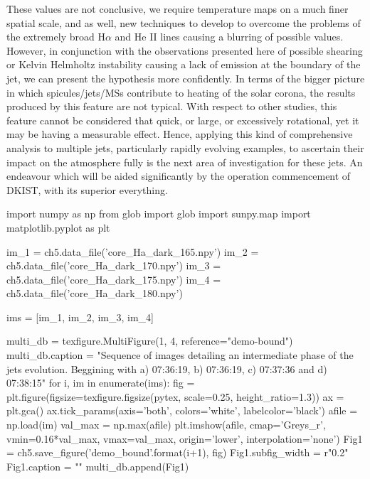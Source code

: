 These values are not conclusive, we require temperature maps on a much finer spatial scale, and as well, new techniques to develop to overcome the problems of the extremely broad H$\alpha$ and He II lines causing a blurring of possible values.
However, in conjunction with the observations presented here of possible shearing or Kelvin Helmholtz instability causing a lack of emission at the boundary of the jet, we can present the hypothesis more confidently.
In terms of the bigger picture in which spicules/jets/MSs contribute to heating of the solar corona, the results produced by this feature are not typical.
With respect to other studies, this feature cannot be considered that quick, or large, or excessively rotational, yet it may be having a measurable effect.
Hence, applying this kind of comprehensive analysis to multiple jets, particularly rapidly evolving examples, to ascertain their impact on the atmosphere fully is the next area of investigation for these jets.
An endeavour which will be aided significantly by the operation commencement of DKIST, with its superior everything.
 


\begin{pycode}[chapter5]
import numpy as np
from glob import glob
import sunpy.map
import matplotlib.pyplot as plt

im_1 = ch5.data_file('core_Ha_dark_165.npy')
im_2 = ch5.data_file('core_Ha_dark_170.npy')
im_3 = ch5.data_file('core_Ha_dark_175.npy')
im_4 = ch5.data_file('core_Ha_dark_180.npy')

ims = [im_1, im_2, im_3, im_4]

multi_db = texfigure.MultiFigure(1, 4, reference="demo-bound")
multi_db.caption = "Sequence of images detailing an intermediate phase of the jets evolution. Beggining with a) 07:36:19, b) 07:36:19, c) 07:37:36 and d) 07:38:15"
for i, im in enumerate(ims):
	fig = plt.figure(figsize=texfigure.figsize(pytex, scale=0.25, height_ratio=1.3))
	ax = plt.gca()
	ax.tick_params(axis='both', colors='white', labelcolor='black')
	afile = np.load(im)
	val_max = np.max(afile)
	plt.imshow(afile, cmap='Greys_r', vmin=0.16*val_max, vmax=val_max, origin='lower', interpolation='none')
	Fig1 = ch5.save_figure('demo_bound{}'.format(i+1), fig)
	Fig1.subfig_width = r"0.2\textwidth"
	Fig1.caption = ""
	multi_db.append(Fig1)

\end{pycode}

